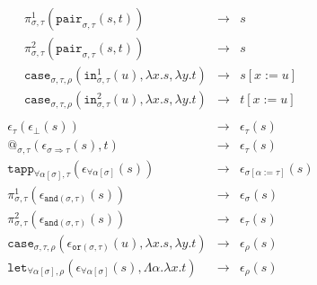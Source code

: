 \documentclass[runningheads,a4paper]{llncs}
\newcommand{\quant}[2]{\forall #1[#2]}
\newcommand{\qquant}[3]{#1 #2[#3]}
\newcommand{\arrtype}{\Rightarrow}
\newcommand{\abs}[2]{\lambda #1.#2}
\newcommand{\tabs}[2]{\Lambda #1.#2}
\begin{document}
\[
\begin{array}{rcl}
\pi^1_{\sigma,\tau}(\mathtt{pair}_{\sigma,\tau}(s,t)) & \to & s \\
\pi^2_{\sigma,\tau}(\mathtt{pair}_{\sigma,\tau}(s,t)) & \to & s \\
\mathtt{case}_{\sigma,\tau,\rho}(\mathtt{in}^1_{\sigma,\tau}(u),
  \abs{x}{s},\abs{y}{t}) & \to & s[x:=u] \\
\mathtt{case}_{\sigma,\tau,\rho}(\mathtt{in}^2_{\sigma,\tau}(u),
  \abs{x}{s},\abs{y}{t}) & \to & t[x:=u] \\
\end{array}
\]
\[
\begin{array}{rcl}
\epsilon_\tau(\epsilon_\bot(s)) & \to & \epsilon_\tau(s) \\
@_{\sigma,\tau}(\epsilon_{\sigma \arrtype \tau}(s),t) & \to &
  \epsilon_\tau(s) \\
\mathtt{tapp}_{\quant{\alpha}{\sigma},\tau}(
  \epsilon_{\quant{\alpha}{\sigma}}(s)) & \to &
  \epsilon_{\sigma[\alpha:=\tau]}(s) \\
\pi^1_{\sigma,\tau}(\epsilon_{\mathtt{and}(\sigma,\tau)}(s)) & \to &
  \epsilon_\sigma(s) \\
\pi^2_{\sigma,\tau}(\epsilon_{\mathtt{and}(\sigma,\tau)}(s)) & \to &
  \epsilon_\tau(s) \\
\mathtt{case}_{\sigma,\tau,\rho}(\epsilon_{\mathtt{or}(\sigma,\tau)}(
  u),\abs{x}{s},\abs{y}{t}) & \to & \epsilon_\rho(s) \\
\mathtt{let}_{\qquant{\forall}{\alpha}{\sigma},\rho}(\epsilon_{\qquant{
  \forall}{\alpha}{\sigma}}(s),\tabs{\alpha}{\abs{x}{t}}) & \to &
  \epsilon_\rho(s) \\
\end{array}
\]
\end{document}
